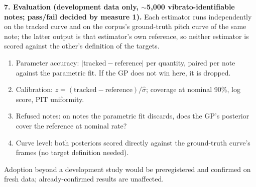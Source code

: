 \documentclass[10pt,a4paper]{article}
\begin{document}
\textbf{7. Evaluation (development data only, $\sim$5{,}000
vibrato-identifiable notes; pass/fail decided by measure 1).}
Each estimator runs independently on the tracked curve and on the
corpus's ground-truth pitch curve of the same note; the latter output is
that estimator's own reference, so neither estimator is scored against
the other's definition of the targets.
\begin{enumerate}[nosep,leftmargin=2em]
  \item Parameter accuracy: $|\text{tracked} - \text{reference}|$ per
        quantity, paired per note against the parametric fit. If the GP
        does not win here, it is dropped.
  \item Calibration: $z = (\text{tracked} - \text{reference})/\hat\sigma$;
        coverage at nominal 90\%, log score, PIT uniformity.
  \item Refused notes: on notes the parametric fit discards, does the
        GP's posterior cover the reference at nominal rate?
  \item Curve level: both posteriors scored directly against the
        ground-truth curve's frames (no target definition needed).
\end{enumerate}
Adoption beyond a development study would be preregistered and confirmed
on fresh data; already-confirmed results are unaffected.
\end{document}
